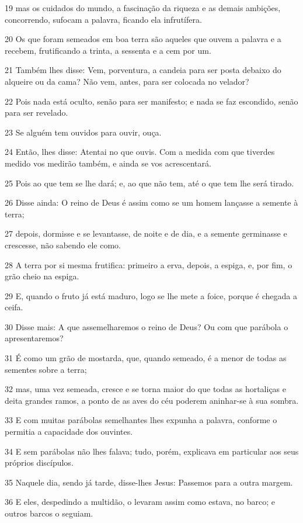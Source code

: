 \par 19 mas os cuidados do mundo, a fascinação da riqueza e as demais ambições, concorrendo, sufocam a palavra, ficando ela infrutífera.
\par 20 Os que foram semeados em boa terra são aqueles que ouvem a palavra e a recebem, frutificando a trinta, a sessenta e a cem por um.
\par 21 Também lhes disse: Vem, porventura, a candeia para ser posta debaixo do alqueire ou da cama? Não vem, antes, para ser colocada no velador?
\par 22 Pois nada está oculto, senão para ser manifesto; e nada se faz escondido, senão para ser revelado.
\par 23 Se alguém tem ouvidos para ouvir, ouça.
\par 24 Então, lhes disse: Atentai no que ouvis. Com a medida com que tiverdes medido vos medirão também, e ainda se vos acrescentará.
\par 25 Pois ao que tem se lhe dará; e, ao que não tem, até o que tem lhe será tirado.
\par 26 Disse ainda: O reino de Deus é assim como se um homem lançasse a semente à terra;
\par 27 depois, dormisse e se levantasse, de noite e de dia, e a semente germinasse e crescesse, não sabendo ele como.
\par 28 A terra por si mesma frutifica: primeiro a erva, depois, a espiga, e, por fim, o grão cheio na espiga.
\par 29 E, quando o fruto já está maduro, logo se lhe mete a foice, porque é chegada a ceifa.
\par 30 Disse mais: A que assemelharemos o reino de Deus? Ou com que parábola o apresentaremos?
\par 31 É como um grão de mostarda, que, quando semeado, é a menor de todas as sementes sobre a terra;
\par 32 mas, uma vez semeada, cresce e se torna maior do que todas as hortaliças e deita grandes ramos, a ponto de as aves do céu poderem aninhar-se à sua sombra.
\par 33 E com muitas parábolas semelhantes lhes expunha a palavra, conforme o permitia a capacidade dos ouvintes.
\par 34 E sem parábolas não lhes falava; tudo, porém, explicava em particular aos seus próprios discípulos.
\par 35 Naquele dia, sendo já tarde, disse-lhes Jesus: Passemos para a outra margem.
\par 36 E eles, despedindo a multidão, o levaram assim como estava, no barco; e outros barcos o seguiam.
